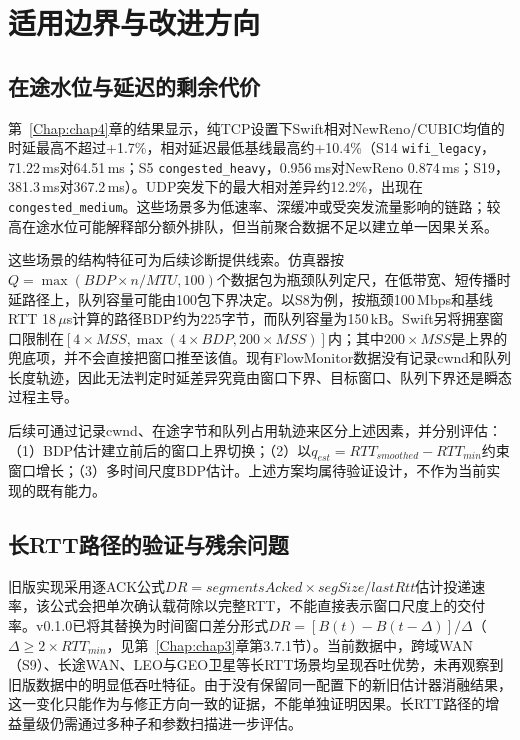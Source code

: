 \section{适用边界与改进方向}
\label{sec:limitation-future}

\subsection{在途水位与延迟的剩余代价}

第~\ref{Chap:chap4}章的结果显示，纯TCP设置下Swift相对NewReno/CUBIC均值的时延最高不超过+1.7\%，相对延迟最低基线最高约+10.4\%（S14 \texttt{wifi\_legacy}，71.22\,ms对64.51\,ms；S5 \texttt{congested\_heavy}，0.956\,ms对NewReno 0.874\,ms；S19，381.3\,ms对367.2\,ms）。UDP突发下的最大相对差异约12.2\%，出现在\texttt{congested\_medium}。这些场景多为低速率、深缓冲或受突发流量影响的链路；较高在途水位可能解释部分额外排队，但当前聚合数据不足以建立单一因果关系。

这些场景的结构特征可为后续诊断提供线索。仿真器按$Q = \max(BDP \times n / MTU, 100)$个数据包为瓶颈队列定尺，在低带宽、短传播时延路径上，队列容量可能由100包下界决定。以S8为例，按瓶颈100\,Mbps和基线RTT 18\,$\mu$s计算的路径BDP约为225字节，而队列容量为150\,kB。Swift另将拥塞窗口限制在$[4 \times MSS, \max(4 \times BDP, 200 \times MSS)]$内；其中$200\times MSS$是上界的兜底项，并不会直接把窗口推至该值。现有FlowMonitor数据没有记录cwnd和队列长度轨迹，因此无法判定时延差异究竟由窗口下界、目标窗口、队列下界还是瞬态过程主导。

后续可通过记录cwnd、在途字节和队列占用轨迹来区分上述因素，并分别评估：（1）BDP估计建立前后的窗口上界切换；（2）以$q_{est}=RTT_{smoothed}-RTT_{min}$约束窗口增长；（3）多时间尺度BDP估计。上述方案均属待验证设计，不作为当前实现的既有能力。

\subsection{长RTT路径的验证与残余问题}

旧版实现采用逐ACK公式$DR = segmentsAcked \times segSize / lastRtt$估计投递速率，该公式会把单次确认载荷除以完整RTT，不能直接表示窗口尺度上的交付率。v0.1.0已将其替换为时间窗口差分形式$DR = [B(t) - B(t-\Delta)]/\Delta$（$\Delta \ge 2 \times RTT_{min}$，见第~\ref{Chap:chap3}章第3.7.1节）。当前数据中，跨域WAN（S9）、长途WAN、LEO与GEO卫星等长RTT场景均呈现吞吐优势，未再观察到旧版数据中的明显低吞吐特征。由于没有保留同一配置下的新旧估计器消融结果，这一变化只能作为与修正方向一致的证据，不能单独证明因果。长RTT路径的增益量级仍需通过多种子和参数扫描进一步评估。

